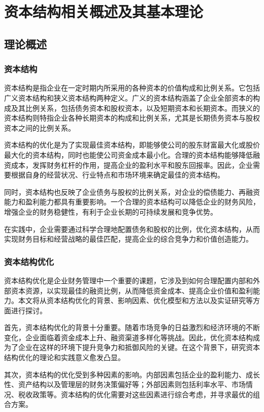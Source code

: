 \chapter{资本结构相关概述及其基本理论}
\section{理论概述}
\subsection{资本结构}
资本结构是指企业在一定时期内所采用的各种资本的价值构成和比例关系。它包括广义资本结构和狭义资本结构两种定义。广义的资本结构涵盖了企业全部资本的构成及其比例关系，包括债务资本和股权资本，以及短期资本和长期资本。而狭义的资本结构则特指企业各种长期资本的构成和比例关系，尤其是长期债务资本与股权资本之间的比例关系。

资本结构的优化是为了实现最佳资本结构，即能够使公司的股东财富最大化或股价最大化的资本结构，同时也能使公司资金成本最小化。合理的资本结构能够降低融资成本，发挥财务杠杆的作用，提高企业的盈利水平和股东回报率。因此，企业需要根据自身的经营状况、行业特点和市场环境来确定最佳的资本结构。

同时，资本结构也反映了企业债务与股权的比例关系，对企业的偿债能力、再融资能力和盈利能力都具有重要影响。一个合理的资本结构可以降低企业的财务风险，增强企业的财务稳健性，有利于企业长期的可持续发展和竞争优势。

在实践中，企业需要通过科学合理地配置债务和股权的比例，优化资本结构，从而实现财务目标和经营战略的最佳匹配，提高企业的综合竞争力和价值创造能力。
\subsection{资本结构优化}
资本结构优化是企业财务管理中一个重要的课题，它涉及到如何合理配置内部和外部资本资源，以实现最佳的融资比例，从而降低资金成本、提高企业价值和盈利能力。本文将从资本结构优化的背景、影响因素、优化模型和方法以及实证研究等方面进行探讨。

首先，资本结构优化的背景十分重要。随着市场竞争的日益激烈和经济环境的不断变化，企业面临着资金成本上升、融资渠道多样化等挑战。因此，优化资本结构成为了企业在这样的环境下提升竞争力和抵御风险的关键。在这个背景下，研究资本结构优化的理论和实践意义愈发凸显。

其次，资本结构的优化受到多种因素的影响。内部因素包括企业的盈利能力、成长性、资产结构以及管理层的财务决策偏好等；外部因素则包括利率水平、市场情况、税收政策等。资本结构的优化需要对这些因素进行综合考虑，并寻求最优的组合方案。\cite{Shen2022}

